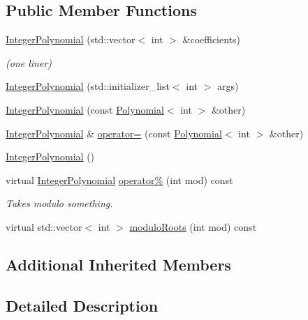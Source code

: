 \subsection*{Public Member Functions}
\begin{DoxyCompactItemize}
\item 
\hyperlink{class_alg_lib_1_1_integer_polynomial_a655e9a0c3787323872d78194fb4321da}{Integer\+Polynomial} (std\+::vector$<$ int $>$ \&coefficients)
\begin{DoxyCompactList}\small\item\em (one liner) \end{DoxyCompactList}\item 
\hyperlink{class_alg_lib_1_1_integer_polynomial_a61873b5d4a577020238163251566077e}{Integer\+Polynomial} (std\+::initializer\+\_\+list$<$ int $>$ args)
\item 
\hyperlink{class_alg_lib_1_1_integer_polynomial_ae2f5396eab8162b3550db51bbcb30c55}{Integer\+Polynomial} (const \hyperlink{class_alg_lib_1_1_polynomial}{Polynomial}$<$ int $>$ \&other)
\item 
\hyperlink{class_alg_lib_1_1_integer_polynomial}{Integer\+Polynomial} \& \hyperlink{class_alg_lib_1_1_integer_polynomial_a6ce9a26baa35c33c35b91be4a930cf95}{operator=} (const \hyperlink{class_alg_lib_1_1_polynomial}{Polynomial}$<$ int $>$ \&other)
\item 
\hyperlink{class_alg_lib_1_1_integer_polynomial_ae74ad4d007e847f6bb385b93865bb88a}{Integer\+Polynomial} ()
\item 
virtual \hyperlink{class_alg_lib_1_1_integer_polynomial}{Integer\+Polynomial} \hyperlink{class_alg_lib_1_1_integer_polynomial_a2589da92ddd64bb3d2b52b7dbd197c07}{operator\%} (int mod) const 
\begin{DoxyCompactList}\small\item\em Takes modulo something. \end{DoxyCompactList}\item 
virtual std\+::vector$<$ int $>$ \hyperlink{class_alg_lib_1_1_integer_polynomial_ab0549a5f249b0b1c2868a784cd9b890b}{modulo\+Roots} (int mod) const 
\end{DoxyCompactItemize}
\subsection*{Additional Inherited Members}


\subsection{Detailed Description}


